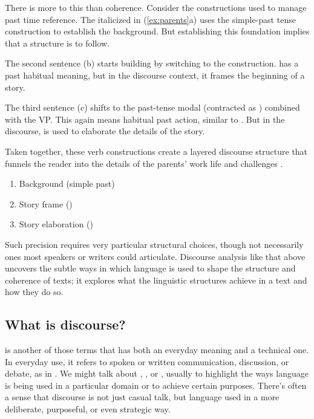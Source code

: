 There is more to this than coherence. Consider the constructions used to manage past time reference. The italicized  in (\ref{ex:parents}a) uses the simple-past tense construction to establish the background. But establishing this foundation implies that a structure is to follow.

The second sentence (b) starts building by switching to the  construction.  has a past habitual meaning, but in the discourse context, it frames the beginning of a story.

The third sentence (c) shifts to the past-tense modal  (contracted as ) combined with the  VP. This  again means habitual past action, similar to . But in the discourse,  is used to elaborate the details of the story.

Taken together, these verb constructions create a layered discourse structure that funnels the reader into the details of the parents' work life and challenges \citep{Suh1992}.

\begin{enumerate}[noitemsep]
    \item Background (simple past)
    \item Story frame ()
    \item Story elaboration ()
\end{enumerate}

Such precision requires very particular structural choices, though not necessarily ones most speakers or writers could articulate. Discourse analysis like that above uncovers the subtle ways in which language is used to shape the structure and coherence of texts; it explores what the linguistic structures achieve in a text and how they do so.

\subsection{What is discourse?}

 is another of those terms that has both an everyday meaning and a technical one. In everyday use, it refers to spoken or written communication, discussion, or debate, as in . We might talk about , , or , usually to highlight the ways language is being used in a particular domain or to achieve certain purposes. There's often a sense that discourse is not just casual talk, but language used in a more deliberate, purposeful, or even strategic way.

